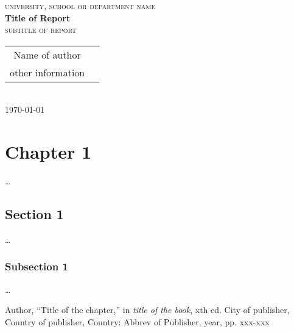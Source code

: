 \documentclass[10pt, a4paper, oneside]{report}
\begin{document}
\thispagestyle{empty}
\begin{center}
  \textsc{university, school or department name} \\ [60pt] 

  \textbf{{\LARGE Title of Report}} \\ [1pt]
  \textsc{{\large subtitle of report }} \\ [20pt]

  \begin{tabular}{cc}
    Name of author  \\
    other information
  \end{tabular} \\ [20pt]
  \today \\
\end{center}
\newpage

\begin{abstract}

\end{abstract}

\newpage

\tableofcontents

\newpage

\chapter{Chapter 1}
\ldots
\section{Section 1}
\ldots
\subsection{Subsection 1}
\ldots
      
\begin{thebibliography}{9}

  Author,
  ``Title of the chapter,'' in 
  \emph{title of the book},
  xth ed.
  City of publisher,
  Country of publisher,
  Country:
  Abbrev of Publisher,
  year,
  pp. xxx-xxx

\end{thebibliography}      
      
\end{document}

